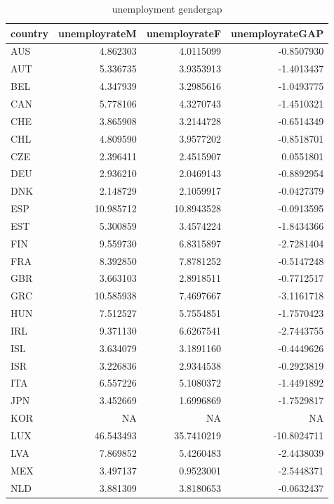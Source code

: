 \documentclass[11pt,a4paper,]{article}
\begin{document}
\begin{table}

\caption{\label{tab:unnamed-chunk-9}unemployment gendergap}
\centering
\begin{tabular}[t]{l|r|r|r}
\hline
country & unemployrateM & unemployrateF & unemployrateGAP\\
\hline
AUS & 4.862303 & 4.0115099 & -0.8507930\\
\hline
AUT & 5.336735 & 3.9353913 & -1.4013437\\
\hline
BEL & 4.347939 & 3.2985616 & -1.0493775\\
\hline
CAN & 5.778106 & 4.3270743 & -1.4510321\\
\hline
CHE & 3.865908 & 3.2144728 & -0.6514349\\
\hline
CHL & 4.809590 & 3.9577202 & -0.8518701\\
\hline
CZE & 2.396411 & 2.4515907 & 0.0551801\\
\hline
DEU & 2.936210 & 2.0469143 & -0.8892954\\
\hline
DNK & 2.148729 & 2.1059917 & -0.0427379\\
\hline
ESP & 10.985712 & 10.8943528 & -0.0913595\\
\hline
EST & 5.300859 & 3.4574224 & -1.8434366\\
\hline
FIN & 9.559730 & 6.8315897 & -2.7281404\\
\hline
FRA & 8.392850 & 7.8781252 & -0.5147248\\
\hline
GBR & 3.663103 & 2.8918511 & -0.7712517\\
\hline
GRC & 10.585938 & 7.4697667 & -3.1161718\\
\hline
HUN & 7.512527 & 5.7554851 & -1.7570423\\
\hline
IRL & 9.371130 & 6.6267541 & -2.7443755\\
\hline
ISL & 3.634079 & 3.1891160 & -0.4449626\\
\hline
ISR & 3.226836 & 2.9344538 & -0.2923819\\
\hline
ITA & 6.557226 & 5.1080372 & -1.4491892\\
\hline
JPN & 3.452669 & 1.6996869 & -1.7529817\\
\hline
KOR & NA & NA & NA\\
\hline
LUX & 46.543493 & 35.7410219 & -10.8024711\\
\hline
LVA & 7.869852 & 5.4260483 & -2.4438039\\
\hline
MEX & 3.497137 & 0.9523001 & -2.5448371\\
\hline
NLD & 3.881309 & 3.8180653 & -0.0632437\\

\end{tabular}
\end{table}
\end{document}

